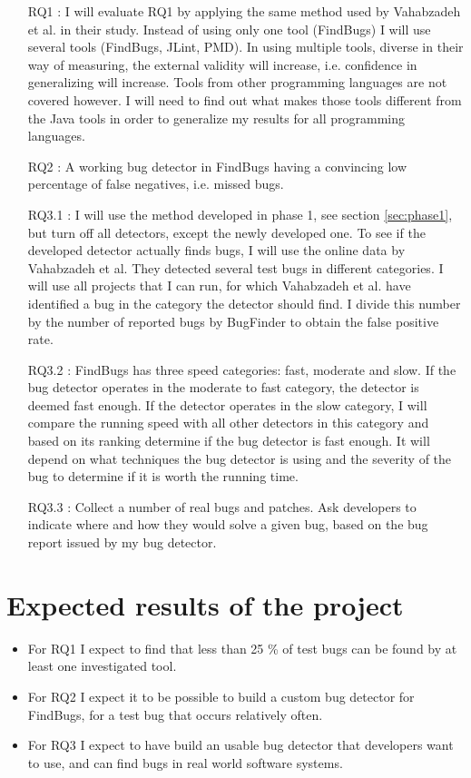 \documentclass{uvamscse}
\newcommand{\Atestbugs}{Vahabzadeh et al.}
\begin{document}
\begin{enumerate}
	\item[RQ1]: I will evaluate RQ1 by applying the same method used by \Atestbugs{} in their study. Instead of using only one tool (FindBugs) I will use several tools (FindBugs, JLint, PMD). In using multiple tools, diverse in their way of measuring, the external validity will increase, i.e. confidence in generalizing will increase. Tools from other programming languages are not covered however. I will need to find out what makes those tools different from the Java tools in order to generalize my results for all programming languages. 
	\item[RQ2]: A working bug detector in FindBugs having a convincing low percentage of false negatives, i.e. missed bugs.   
	\item[RQ3.1]: I will use the method developed in phase 1, see section  \ref{sec:phase1}, but turn off all detectors, except the newly developed one. To see if the developed detector actually finds bugs, I will use the online data by \Atestbugs{} They detected several test bugs in different categories. I will use all projects that I can run, for which \Atestbugs{} have identified a bug in the category the detector should find. I divide this number by the number of reported bugs by BugFinder to obtain the false positive rate. 
	\item[RQ3.2]: FindBugs has three speed categories: fast, moderate and slow. If the bug detector operates in the moderate to fast category, the detector is deemed fast enough. If the detector operates in the slow category, I will compare the running speed with all other detectors in this category and based on its ranking determine if the bug detector is fast enough. It will depend on what techniques the bug detector is using and the severity of the bug to determine if it is worth the running time.  
	\item[RQ3.3]: Collect a number of real bugs and patches. Ask developers to indicate where and how they would solve a given bug, based on the bug report issued by my bug detector. 
\end{enumerate}

\section{Expected results of the project}
\begin{itemize}
	\item For RQ1 I expect to find that less than 25 \% of test bugs can be found by at least one investigated tool.
	\item For RQ2 I expect it to be possible to build a custom bug detector for FindBugs, for a test bug that occurs relatively often. 
	\item For RQ3 I expect to have build an usable bug detector that developers want to use, and can find bugs in real world software systems.  
\end{itemize}
\end{document}
